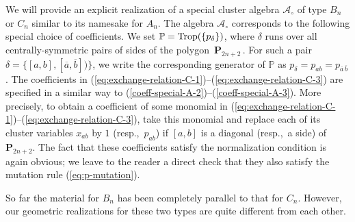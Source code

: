 \documentclass[letterpaper]{amsart}
\numberwithin{equation}{section}
\theoremstyle{definition}
\def\AA{\mathcal{A}}
\def\PP{\mathbb{P}}
\def\Poly{\mathbf{P}}
\def\Trop{{\rm Trop}}
\begin{document}
We will provide an explicit realization of a special cluster 
algebra $\AA_\circ$ of type $B_n$ or $C_n$ 
similar to its namesake for $A_n$. 
The algebra $\AA_\circ$ corresponds to the following special choice of coefficients. 
We set $\PP = \Trop (\{p_\delta\})$, where 
$\delta$ runs over all centrally-symmetric pairs of sides of the polygon~$\Poly_{2n+2}\,$. 
For such a pair $\delta = \{[a,b], [\overline a, \overline b])\}$, 
we write the corresponding generator of $\PP$ as 
$p_\delta = p_{ab} = p_{\overline a \, \overline b}$. 
The coefficients in 
(\ref{eq:exchange-relation-C-1})--(\ref{eq:exchange-relation-C-3}) 
are specified in a similar way to 
(\ref{coeff-special-A-2})--(\ref{coeff-special-A-3}). 
More precisely, to obtain a coefficient of some monomial in 
(\ref{eq:exchange-relation-C-1})--(\ref{eq:exchange-relation-C-3}), 
take this monomial and replace each of its cluster variables 
$x_{ab}$ by $1$ (resp.,~$p_{ab}$) if $[a,b]$ is a diagonal 
(resp.,~a side) of $\Poly_{2n+2}$. 
The fact that these coefficients satisfy the normalization 
condition is again obvious; we leave to the reader a direct check 
that they also satisfy the mutation rule (\ref{eq:p-mutation}). 
 
So far the material for $B_n$ has been completely parallel to 
that for $C_n$. 
However, our geometric realizations for these two types are quite different from 
each other. 
 
\end{document}
